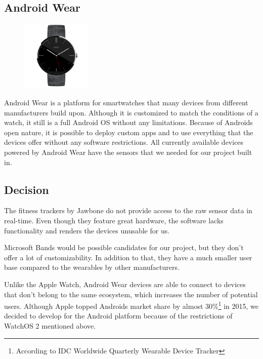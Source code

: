 \clearpage

\subsection{Android Wear}
\begin{figure}
	\begin{center}
		\includegraphics[width=0.3\textwidth]{images/device_moto360.png}
	\end{center}
\end{figure}
Android Wear is a platform for smartwatches that many devices from different manufacturers build upon.
Although it is customized to match the conditions of a watch, it still is a full Android OS without any limitations.
Because of Androids open nature, it is possible to deploy custom apps and to use everything that the devices offer without any software restrictions.
All currently available devices powered by Android Wear have the sensors that we needed for our project built in.

\subsection{Decision}

The fitness trackers by Jawbone do not provide access to the raw sensor data in real-time.
Even though they feature great hardware, the software lacks functionality and renders the devices unusable for us.

Microsoft Bands would be possible candidates for our project, but they don't offer a lot of customizability.
In addition to that, they have a much smaller user base compared to the wearables by other manufacturers.

Unlike the Apple Watch, Android Wear devices are able to connect to devices that don't belong to the same ecosystem, which increases the number of potential users. Although Apple topped Androids market share by almost 30\%\footnote{According to IDC Worldwide Quarterly Wearable Device Tracker} in 2015, we decided to develop for the Android platform because of the restrictions of WatchOS 2 mentioned above.

\clearpage